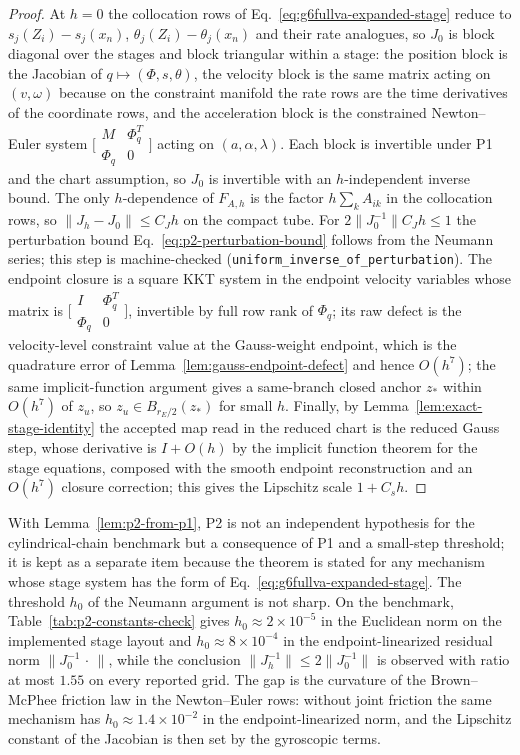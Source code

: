 \documentclass[preprint,12pt]{elsarticle}
\begin{document}
\begin{proof}
At $h=0$ the collocation rows of Eq.~\eqref{eq:g6fullva-expanded-stage}
reduce to $s_j(Z_i)-s_j(x_n)$, $\theta_j(Z_i)-\theta_j(x_n)$ and their rate
analogues, so $J_0$ is block diagonal over the stages and block triangular
within a stage: the position block is the Jacobian of
$q\mapsto(\Phi,s,\theta)$, the velocity block is the same matrix acting on
$(v,\omega)$ because on the constraint manifold the rate rows are the time
derivatives of the coordinate rows, and the acceleration block is the
constrained Newton--Euler
system $\bigl[\begin{smallmatrix}M&\Phi_q^T\\ \Phi_q&0\end{smallmatrix}\bigr]$
acting on $(a,\alpha,\lambda)$. Each block is invertible under P1 and the
chart assumption, so $J_0$ is invertible with an $h$-independent inverse
bound. The only $h$-dependence of $F_{A,h}$ is the factor $h\sum_kA_{ik}$ in
the collocation rows, so $\|J_h-J_0\|\le C_Jh$ on the compact tube. For
$2\|J_0^{-1}\|C_Jh\le1$ the perturbation bound
Eq.~\eqref{eq:p2-perturbation-bound} follows from the Neumann series; this
step is machine-checked (\texttt{uniform\_inverse\_of\_perturbation}). The
endpoint closure is a square KKT system in the endpoint velocity variables
whose matrix is $\bigl[\begin{smallmatrix}I&\Phi_q^T\\ \Phi_q&0\end{smallmatrix}\bigr]$,
invertible by full row rank of $\Phi_q$; its raw defect is the velocity-level
constraint value at the Gauss-weight endpoint, which is the quadrature error
of Lemma~\ref{lem:gauss-endpoint-defect} and hence $O(h^7)$; the same
implicit-function argument gives a same-branch closed anchor $z_\ast$ within
$O(h^7)$ of $z_u$, so $z_u\in B_{r_E/2}(z_\ast)$ for small $h$. Finally, by
Lemma~\ref{lem:exact-stage-identity} the accepted map read in the reduced
chart is the reduced Gauss step, whose derivative is $I+O(h)$ by the
implicit function theorem for the stage equations, composed with the smooth
endpoint reconstruction and an $O(h^7)$ closure correction; this gives the
Lipschitz scale $1+C_sh$.
\end{proof}

With Lemma~\ref{lem:p2-from-p1}, P2 is not an independent hypothesis for the
cylindrical-chain benchmark but a consequence of P1 and a small-step
threshold; it is kept as a separate item because the theorem is stated for
any mechanism whose stage system has the form of
Eq.~\eqref{eq:g6fullva-expanded-stage}. The threshold $h_0$ of the Neumann
argument is not sharp. On the benchmark, Table~\ref{tab:p2-constants-check}
gives $h_0\approx2\times10^{-5}$ in the Euclidean norm on the implemented
stage layout and $h_0\approx8\times10^{-4}$ in the endpoint-linearized
residual norm $\|J_0^{-1}\,\cdot\,\|$, while the conclusion
$\|J_h^{-1}\|\le2\|J_0^{-1}\|$ is observed with ratio at most $1.55$ on
every reported grid. The gap is the curvature of the Brown--McPhee friction
law in the Newton--Euler rows: without joint friction the same mechanism has
$h_0\approx1.4\times10^{-2}$ in the endpoint-linearized norm, and the
Lipschitz constant of the Jacobian is then set by the gyroscopic terms.
\end{document}
